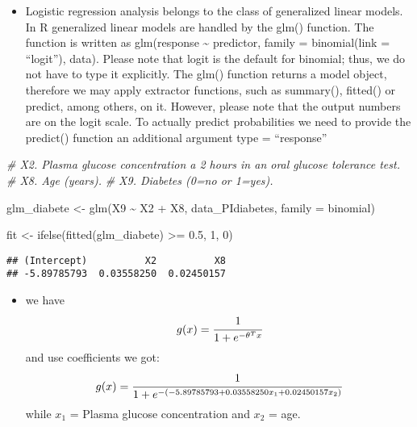 \documentclass[
]{article}
\newenvironment{Shaded}{\begin{snugshade}}{\end{snugshade}}
\newcommand{\AttributeTok}[1]{\textcolor[rgb]{0.77,0.63,0.00}{#1}}
\newcommand{\CommentTok}[1]{\textcolor[rgb]{0.56,0.35,0.01}{\textit{#1}}}
\newcommand{\DecValTok}[1]{\textcolor[rgb]{0.00,0.00,0.81}{#1}}
\newcommand{\FloatTok}[1]{\textcolor[rgb]{0.00,0.00,0.81}{#1}}
\newcommand{\FunctionTok}[1]{\textcolor[rgb]{0.00,0.00,0.00}{#1}}
\newcommand{\NormalTok}[1]{#1}
\newcommand{\OtherTok}[1]{\textcolor[rgb]{0.56,0.35,0.01}{#1}}
\newcommand{\SpecialCharTok}[1]{\textcolor[rgb]{0.00,0.00,0.00}{#1}}
\providecommand{\tightlist}{%
  \setlength{\itemsep}{0pt}\setlength{\parskip}{0pt}}
\begin{document}
\begin{itemize}
\tightlist
\item
  Logistic regression analysis belongs to the class of generalized
  linear models. In R generalized linear models are handled by the glm()
  function. The function is written as glm(response \textasciitilde{}
  predictor, family = binomial(link = ``logit''), data). Please note
  that logit is the default for binomial; thus, we do not have to type
  it explicitly. The glm() function returns a model object, therefore we
  may apply extractor functions, such as summary(), fitted() or predict,
  among others, on it. However, please note that the output numbers are
  on the logit scale. To actually predict probabilities we need to
  provide the predict() function an additional argument type =
  ``response''
\end{itemize}

\begin{Shaded}
\begin{Highlighting}[]
\CommentTok{\# X2. Plasma glucose concentration a 2 hours in an oral glucose tolerance test.}
\CommentTok{\# X8. Age (years).}
\CommentTok{\# X9. Diabetes (0=no or 1=yes).}

\NormalTok{glm\_diabete }\OtherTok{\textless{}{-}} \FunctionTok{glm}\NormalTok{(X9 }\SpecialCharTok{\textasciitilde{}}\NormalTok{ X2 }\SpecialCharTok{+}\NormalTok{ X8, data\_PIdiabetes, }\AttributeTok{family =}\NormalTok{ binomial)}

\NormalTok{fit }\OtherTok{\textless{}{-}} \FunctionTok{ifelse}\NormalTok{(}\FunctionTok{fitted}\NormalTok{(glm\_diabete) }\SpecialCharTok{\textgreater{}=} \FloatTok{0.5}\NormalTok{, }\DecValTok{1}\NormalTok{, }\DecValTok{0}\NormalTok{)}
\end{Highlighting}
\end{Shaded}

\begin{Shaded}
\end{Shaded}

\begin{verbatim}
## (Intercept)          X2          X8 
## -5.89785793  0.03558250  0.02450157
\end{verbatim}

\begin{itemize}
\tightlist
\item
  we have \[g(x) = \cfrac{1}{1 + e^{-\theta^T x}} \] and use
  coefficients we got:
  \[g(x) = \cfrac{1}{1 + e^{-(-5.89785793 + 0.03558250x_1 + 0.02450157x_2)}} \]
  while \(x_1\) = Plasma glucose concentration and \(x_2\) = age.
\end{itemize}
\end{document}
